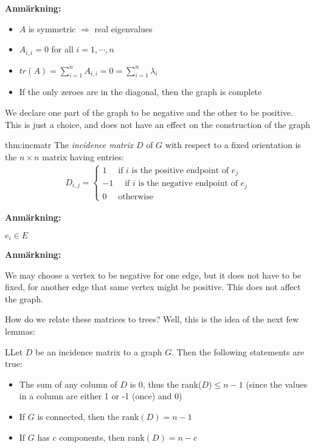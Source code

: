 \par\bigskip
\noindent\textbf{Anmärkning:}\par
\begin{itemize}
  \item $A$ is symmetric $\Rightarrow$ real eigenvalues
  \item $A_{i,i} = 0$ for all $i=1,\cdots,n$
  \item $tr(A) = \sum_{i=1}^{n}A_{i,i} = 0 = \sum_{i=1}^{n}\lambda_i$
  \item If the only zeroes are in the diagonal, then the graph is complete
\end{itemize}
\par\bigskip
\noindent We declare one part of the graph to be negative and the other to be positive. This is just a choice, and does not have an effect on the construction of the graph
\par\bigskip
\begin{theo}{thm:incmatr}
  The \textit{incidence matrix} $D$ of $G$ with respect to a fixed orientation is the $n\times n$ matrix having entries:
  \begin{equation*}
    \begin{gathered}
      D_{i,j} = \begin{cases}1\quad \text{ if $i$ is the positive endpoint of $e_j$}\\-1\quad\text{ if $i$ is the negative endpoint of $e_j$}\\0\quad \text{ otherwise}\end{cases}
    \end{gathered}
  \end{equation*}
  \par\bigskip
  \noindent\textbf{Anmärkning:}\par
  \noindent $e_i\in E$
  \par\bigskip
  \noindent\textbf{Anmärkning:}\par
  \noindent We may choose a vertex to be negative for one edge, but it does not have to be fixed, for another edge that same vertex might be positive. This does not affect the graph. 
\end{theo}
\newpage
\noindent How do we relate these matrices to trees? Well, this is the idea of the next few lemmas:
\par\bigskip
\begin{lem}
  LLet $D$ be an incidence matrix to a graph $G$. Then the following statements are true:\par
  \begin{itemize}
    \item The sum of any column of $D$ is 0, thus the rank($D$)$\leq n-1$ (since the values in a column are either 1 or -1 (once) and 0)\par
    \item If $G$ is connected, then the rank$(D) = n-1$
    \item If $G$ has $c$ components, then rank$(D) = n-c$
  \end{itemize}
\end{lem}
